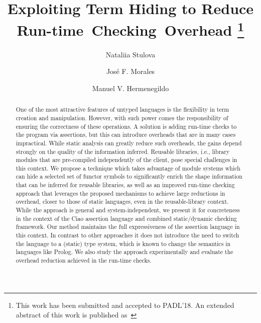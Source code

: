 \documentclass{llncs}
\newcommand{\finalcompression}[1]{\vspace*{#1}}
\begin{document}
\title{Exploiting Term Hiding to Reduce Run-time~Checking~Overhead
  \thanks{%
     This work has been submitted and accepted to PADL'18. %
     An extended abstract of this work is published
     as~\cite{termhide-iclp2017-tc-short}}}

\author{Nataliia Stulova\Letter{}%
        \and
        Jos\'{e} F. Morales%
        \and
        Manuel V. Hermenegildo%
}



\maketitle

\finalcompression{-7mm}
\begin{abstract}
One of the most attractive features of untyped languages
is the flexibility in term creation and manipulation.
%
However, with such power comes the responsibility of ensuring the
correctness of these operations.
%
A
solution is adding run-time checks to the program via assertions, but this
can introduce overheads that are in many cases impractical.
%
While static analysis can greatly reduce such overheads, the gains
depend strongly on the quality of the information inferred.
%
Reusable libraries, i.e., library modules that are pre-compiled
independently of the client, pose special challenges in this context.
%
We propose a technique which takes advantage of module systems which can
hide a selected set of functor symbols to significantly enrich the shape
information that can be inferred for reusable libraries,
%
as well as an improved run-time checking approach that leverages the
proposed mechanisms to achieve large reductions in overhead, closer to
those of static languages, even in the reusable-library context.
%
While the approach is general and system-independent, we present it
for concreteness in the context of the Ciao assertion language and
combined static/dynamic checking framework.
%
Our method maintains the full expressiveness of the assertion language
in this context.
%
In contrast to other approaches it does not introduce the need to switch
the language to a (static) type system, which is known to change the
semantics in languages like Prolog.
%
We also study the approach experimentally
and evaluate the overhead reduction achieved in the run-time checks.
%
\end{abstract}
\end{document}
